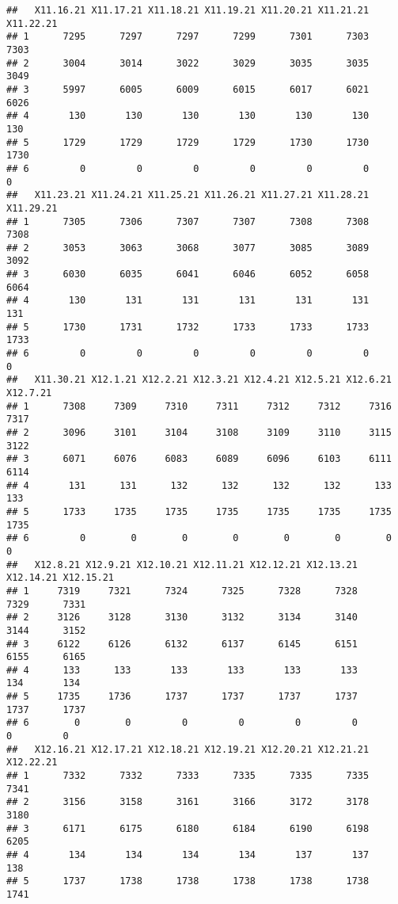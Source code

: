 \documentclass[
]{article}
\begin{document}
\begin{verbatim}
##   X11.16.21 X11.17.21 X11.18.21 X11.19.21 X11.20.21 X11.21.21 X11.22.21
## 1      7295      7297      7297      7299      7301      7303      7303
## 2      3004      3014      3022      3029      3035      3035      3049
## 3      5997      6005      6009      6015      6017      6021      6026
## 4       130       130       130       130       130       130       130
## 5      1729      1729      1729      1729      1730      1730      1730
## 6         0         0         0         0         0         0         0
##   X11.23.21 X11.24.21 X11.25.21 X11.26.21 X11.27.21 X11.28.21 X11.29.21
## 1      7305      7306      7307      7307      7308      7308      7308
## 2      3053      3063      3068      3077      3085      3089      3092
## 3      6030      6035      6041      6046      6052      6058      6064
## 4       130       131       131       131       131       131       131
## 5      1730      1731      1732      1733      1733      1733      1733
## 6         0         0         0         0         0         0         0
##   X11.30.21 X12.1.21 X12.2.21 X12.3.21 X12.4.21 X12.5.21 X12.6.21 X12.7.21
## 1      7308     7309     7310     7311     7312     7312     7316     7317
## 2      3096     3101     3104     3108     3109     3110     3115     3122
## 3      6071     6076     6083     6089     6096     6103     6111     6114
## 4       131      131      132      132      132      132      133      133
## 5      1733     1735     1735     1735     1735     1735     1735     1735
## 6         0        0        0        0        0        0        0        0
##   X12.8.21 X12.9.21 X12.10.21 X12.11.21 X12.12.21 X12.13.21 X12.14.21 X12.15.21
## 1     7319     7321      7324      7325      7328      7328      7329      7331
## 2     3126     3128      3130      3132      3134      3140      3144      3152
## 3     6122     6126      6132      6137      6145      6151      6155      6165
## 4      133      133       133       133       133       133       134       134
## 5     1735     1736      1737      1737      1737      1737      1737      1737
## 6        0        0         0         0         0         0         0         0
##   X12.16.21 X12.17.21 X12.18.21 X12.19.21 X12.20.21 X12.21.21 X12.22.21
## 1      7332      7332      7333      7335      7335      7335      7341
## 2      3156      3158      3161      3166      3172      3178      3180
## 3      6171      6175      6180      6184      6190      6198      6205
## 4       134       134       134       134       137       137       138
## 5      1737      1738      1738      1738      1738      1738      1741

\end{verbatim}
\end{document}
